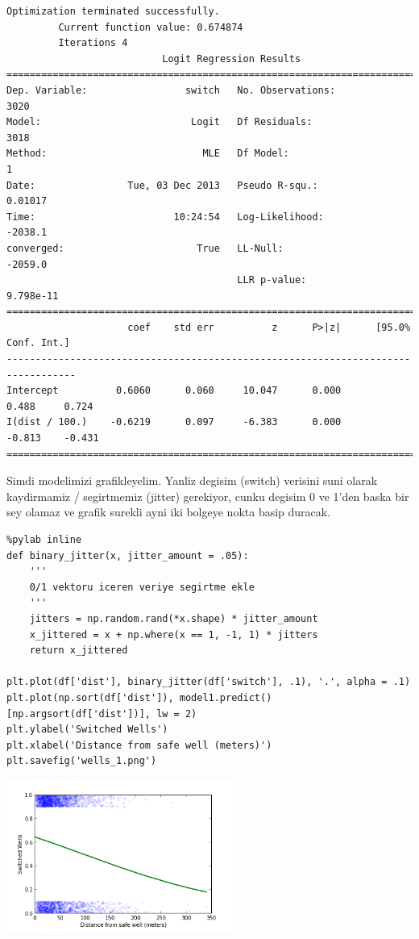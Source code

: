 \documentclass[12pt,fleqn]{article}\usepackage{../common}
\begin{document}
\begin{verbatim}
Optimization terminated successfully.
         Current function value: 0.674874
         Iterations 4
                           Logit Regression Results                           
==============================================================================
Dep. Variable:                 switch   No. Observations:                 3020
Model:                          Logit   Df Residuals:                     3018
Method:                           MLE   Df Model:                            1
Date:                Tue, 03 Dec 2013   Pseudo R-squ.:                 0.01017
Time:                        10:24:54   Log-Likelihood:                -2038.1
converged:                       True   LL-Null:                       -2059.0
                                        LLR p-value:                 9.798e-11
==================================================================================
                     coef    std err          z      P>|z|      [95.0% Conf. Int.]
----------------------------------------------------------------------------------
Intercept          0.6060      0.060     10.047      0.000         0.488     0.724
I(dist / 100.)    -0.6219      0.097     -6.383      0.000        -0.813    -0.431
==================================================================================
\end{verbatim}

Simdi modelimizi grafikleyelim. Yanliz degisim (switch) verisini suni olarak
kaydirmamiz / segirtmemiz (jitter) gerekiyor, cunku degisim 0 ve 1'den baska
bir sey olamaz ve grafik surekli ayni iki bolgeye nokta basip duracak. 

\begin{verbatim}
%pylab inline
def binary_jitter(x, jitter_amount = .05):
    '''
    0/1 vektoru iceren veriye segirtme ekle
    '''
    jitters = np.random.rand(*x.shape) * jitter_amount
    x_jittered = x + np.where(x == 1, -1, 1) * jitters
    return x_jittered

plt.plot(df['dist'], binary_jitter(df['switch'], .1), '.', alpha = .1)
plt.plot(np.sort(df['dist']), model1.predict()[np.argsort(df['dist'])], lw = 2)
plt.ylabel('Switched Wells')
plt.xlabel('Distance from safe well (meters)')
plt.savefig('wells_1.png')
\end{verbatim}

\includegraphics[height=5cm]{wells_1.png}
\end{document}

